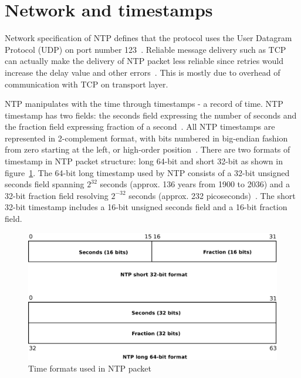 
\section{Network and timestamps}\label{sec:ntp-network}
Network specification of NTP defines that
the protocol uses the User Datagram Protocol (UDP) on port number 123~\cite{ianna-ports,rfc5905}.
Reliable message delivery such as TCP can actually make the delivery of
NTP packet less reliable since retries
would increase the delay value and other errors~\cite{rfc5905}.
This is mostly due to overhead of communication with TCP on transport layer.

NTP manipulates with the time through timestamps - a record of time.
NTP timestamp has two fields: the seconds field expressing the number of seconds
and the fraction field expressing fraction of a second~\cite{rfc5905}.
All NTP timestamps are represented in 2-complement format, with
bits numbered in big-endian fashion from zero starting at the left, or high-order position~\cite{rfc5905}.
There are two formats of timestamp in NTP packet structure:
long 64-bit and short 32-bit as shown in figure~\ref{fig:ntp-timestamps}.
The 64-bit long timestamp used by NTP consists of a 32-bit unsigned seconds
field spanning $2^{32}$ seconds (approx. 136 years from 1900 to 2036) and a 32-bit fraction field resolving
$2^{-32}$ seconds (approx. 232 picoseconds)~\cite{rfc5905}.
The short 32-bit timestamp includes a 16-bit unsigned seconds field
and a 16-bit fraction field.

\begin{figure}
	\centering
	\includegraphics[width=13cm,keepaspectratio]{fig/ntp-timestamps.pdf}
	\caption{Time formats used in NTP packet}
	\label{fig:ntp-timestamps}
	\bigskip
\end{figure}

